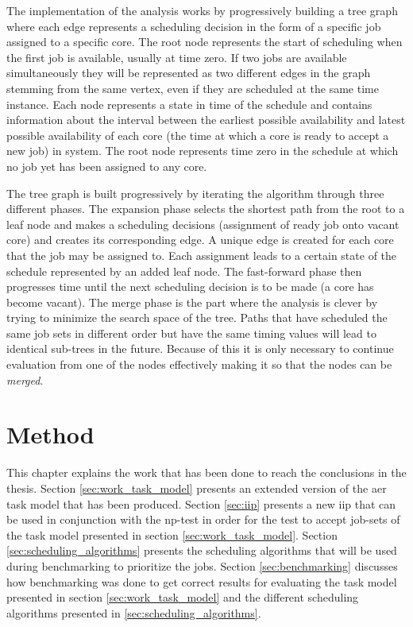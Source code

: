 \documentclass{kththesis}
\begin{document}
The implementation of the analysis works by progressively building a tree graph where each edge
represents a scheduling decision in the form of a specific job assigned to a specific core. The root
node represents the start of scheduling when the first job is available, usually at time zero. 
If two jobs are available simultaneously they will be represented as two different edges in the graph
stemming from the same vertex, even if they are scheduled at the same time instance. Each node
represents a state in time of the schedule and contains information about the interval between the
earliest possible availability and latest possible availability of each core (the time at which a
core is ready to accept a new job) in
system. The root node represents time zero in the schedule at which no job yet has been assigned to
any core. 

The tree graph is built progressively by iterating the algorithm through three different phases.
The expansion phase selects the shortest path from the root to a leaf node and makes a scheduling
decisions (assignment of ready job onto vacant core) and creates its corresponding edge. A unique
edge is created for each core that the job may be assigned to. Each assignment leads to a certain
state of the schedule represented by an added leaf node. The fast-forward phase then progresses 
time until the next scheduling decision is to be made (a core has become vacant). The merge phase is
the part where the analysis is clever by trying to minimize the search space of the tree. Paths that
have scheduled the same job sets in different order but have the same timing values will lead to
identical sub-trees in the future. Because of this it is only necessary to continue evaluation from
one of the nodes effectively making it so that the nodes can be \textit{merged}.


\chapter{Method} \label{ch:method}

This chapter explains the work that has been done to reach the conclusions in the thesis. Section
\ref{sec:work_task_model} presents an extended version of the \acrshort{aer} task model that has
been produced. Section \ref{sec:iip} presents a new \acrshort{iip} that can be used in conjunction
with the \acrshort{np}-test in order for the test to accept job-sets of the task model presented in
section \ref{sec:work_task_model}. Section \ref{sec:scheduling_algorithms} presents the scheduling
algorithms that will be used during benchmarking to prioritize the jobs. Section
\ref{sec:benchmarking} discusses how benchmarking was done to get correct results for evaluating the
task model presented in section \ref{sec:work_task_model} and the different scheduling algorithms
presented in \ref{sec:scheduling_algorithms}.
\end{document}

